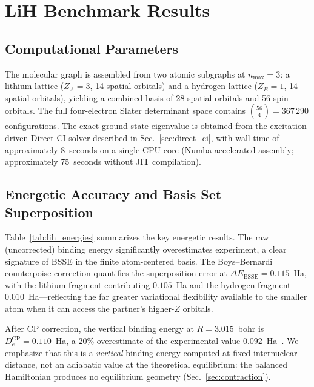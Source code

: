 \documentclass[aps,pra,twocolumn,superscriptaddress,longbibliography]{revtex4-2}
\begin{document}
\section{LiH Benchmark Results}
\label{sec:results}

\subsection{Computational Parameters}
\label{sec:params}

The molecular graph is assembled from two atomic subgraphs at
$n_{\max}=3$: a lithium lattice ($Z_A=3$, 14 spatial orbitals) and a
hydrogen lattice ($Z_B=1$, 14 spatial orbitals), yielding a combined
basis of 28 spatial orbitals and 56 spin-orbitals.  The full
four-electron Slater determinant space contains $\binom{56}{4} =
367\,290$ configurations.  The exact ground-state eigenvalue is obtained
from the excitation-driven Direct CI solver described in
Sec.~\ref{sec:direct_ci}, with wall time of approximately 8~seconds on
a single CPU core (Numba-accelerated assembly; approximately 75~seconds
without JIT compilation).

\subsection{Energetic Accuracy and Basis Set Superposition}
\label{sec:energy}

Table~\ref{tab:lih_energies} summarizes the key energetic results.  The
raw (uncorrected) binding energy significantly overestimates experiment,
a clear signature of BSSE in the finite atom-centered basis.  The
Boys--Bernardi counterpoise correction quantifies the superposition
error at $\Delta E_{\mathrm{BSSE}} = 0.115$~Ha, with the lithium
fragment contributing $0.105$~Ha and the hydrogen fragment
$0.010$~Ha---reflecting the far greater variational flexibility
available to the smaller atom when it can access the partner's
higher-$Z$ orbitals.

After CP correction, the vertical binding energy at $R=3.015$~bohr is
$D_e^{\mathrm{CP}} = 0.110$~Ha, a 20\% overestimate of the experimental
value $0.092$~Ha~\cite{huber}.  We emphasize that this is a
\emph{vertical} binding energy computed at fixed internuclear distance,
not an adiabatic value at the theoretical equilibrium: the balanced
Hamiltonian produces no equilibrium geometry (Sec.~\ref{sec:contraction}).
\end{document}
